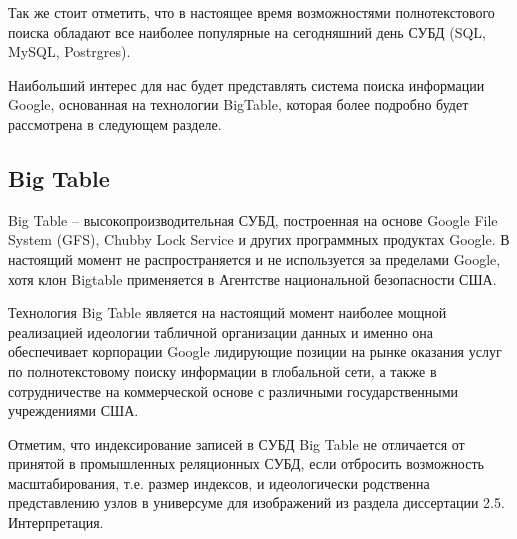 Так же стоит отметить, что в настоящее время возможностями полнотекстового поиска обладают все наиболее популярные на сегодняшний день СУБД (SQL, MySQL, Postrgres).

Наибольший интерес для нас будет представлять система поиска информации Google, основанная на технологии BigTable, которая более подробно будет рассмотрена  в следующем разделе. 
\subsection{Big Table}
Big Table -- высокопроизводительная СУБД, построенная на основе Google File System (GFS), Chubby Lock Service и  других программных продуктах Google. В настоящий момент не распространяется и не используется за пределами Google, хотя клон Bigtable применяется в Агентстве национальной безопасности США.

Технология  Big Table  является на настоящий момент наиболее мощной реализацией идеологии табличной организации данных и именно она обеспечивает корпорации Google лидирующие позиции на рынке оказания услуг по полнотекстовому поиску информации в глобальной сети, а также в сотрудничестве на коммерческой основе с различными государственными учреждениями США.

Отметим, что индексирование записей в  СУБД  Big Table  не отличается от принятой в промышленных реляционных СУБД, если отбросить возможность масштабирования, т.е. размер индексов, и идеологически родственна представлению узлов в универсуме для изображений из раздела диссертации 2.5. Интерпретация. 

